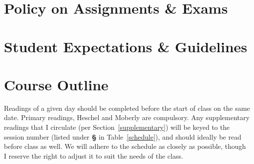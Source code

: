 \documentclass[titlepage]{article}
\newcommand\policy{../policy}
\begin{document}


\section{Policy on Assignments \& Exams}
\label{policy}





\section{Student Expectations \& Guidelines}
\label{expectations}







\section{Course Outline}
\label{outline}

Readings of a given day should be completed before the start of class on
the same date. Primary readings, Heschel and Moberly are compulsory. Any
supplementary readings that I circulate (per
Section~\ref{supplementary}) will be keyed to the session number (listed
under \textbf{\S} in Table~\ref{schedule}), and should ideally be read
before class as well. We will adhere to the schedule as closely as
possible, though I reserve the right to adjust it to suit the needs of
the class.

\newcommand\Yhwh{\textsc{Yhwh}}
\newcommand\rarr{\char"2192\hspace*{0.5pt}}
\end{document}
